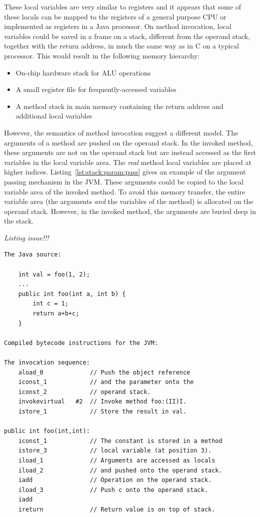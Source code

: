 These local variables are very similar to registers and it appears
that some of these locals can be mapped to the registers of a
general purpose CPU or implemented as registers in a Java processor.
On method invocation, local variables could be saved in a frame on a
stack, different from the operand stack, together with the return
address, in much the same way as in C on a typical processor. This
would result in the following memory hierarchy:
%
\begin{itemize}
\item On-chip hardware stack for ALU operations
\item A small register file for frequently-accessed variables
\item A method stack in main memory containing the return address and additional
local variables
\end{itemize}
%
However, the semantics of method invocation suggest a different
model. The arguments of a method are pushed on the operand stack. In
the invoked method, these arguments are not on the operand stack but
are instead accessed as the first variables in the local variable
area. The \emph{real} method local variables are placed at higher
indices. Listing~\ref{lst:stack:param:pass} gives an example of the
argument passing mechanism in the JVM. These arguments could be
copied to the local variable area of the invoked method. To avoid
this memory transfer, the entire variable area (the arguments
\emph{and} the variables of the method) is allocated on the operand
stack. However, in the invoked method, the arguments are buried deep
in the stack.

\emph{Listing issue!!!}
\begin{lstlisting}[float,caption={Example of parameter passing and access},label={lst:stack:param:pass}]
The Java source:

    int val = foo(1, 2);
    ...
    public int foo(int a, int b) {
        int c = 1;
        return a+b+c;
    }

Compiled bytecode instructions for the JVM:

The invocation sequence:
    aload_0             // Push the object reference
    iconst_1            // and the parameter onto the
    iconst_2            // operand stack.
    invokevirtual   #2  // Invoke method foo:(II)I.
    istore_1            // Store the result in val.

public int foo(int,int):
    iconst_1            // The constant is stored in a method
    istore_3            // local variable (at position 3).
    iload_1             // Arguments are accessed as locals
    iload_2             // and pushed onto the operand stack.
    iadd                // Operation on the operand stack.
    iload_3             // Push c onto the operand stack.
    iadd
    ireturn             // Return value is on top of stack.
\end{lstlisting}


